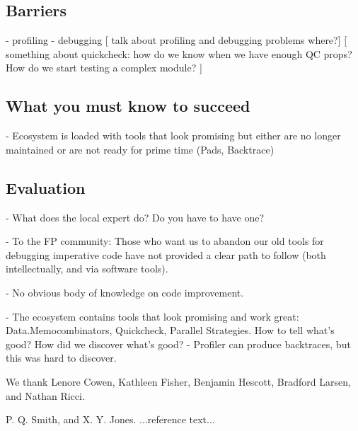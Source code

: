 \documentclass[preprint,nocopyrightspace,times]{sigplanconf}
\begin{document}
\subsection{Barriers}

- profiling
- debugging
 [ talk about profiling and debugging problems where?]
[ something about quickcheck: how do we know when we have enough QC props? How do we start testing a complex module? ]

\subsection{What you must know to succeed}
- Ecosystem is loaded with tools that look promising but either are no longer maintained or are not ready for prime time (Pads, Backtrace)

\subsection{Evaluation}
- What does the local expert do? Do you have to have one?

- To the FP community: Those who want us to abandon our old tools for debugging imperative code have not provided a clear path to follow (both intellectually, and via software tools).

- No obvious body of knowledge on code improvement.

- The ecosystem contains tools that look promising and work great: Data.Memocombinators, Quickcheck, Parallel Strategies. How to tell what's good? How did we discover what's good?
- Profiler can produce backtraces, but this was hard to discover.

% 

\acks

We thank Lenore Cowen, Kathleen Fisher, Benjamin Hescott, Bradford Larsen, and Nathan Ricci.





\begin{thebibliography}{}
\softraggedright

P. Q. Smith, and X. Y. Jones. ...reference text...

\end{thebibliography}
\end{document}
